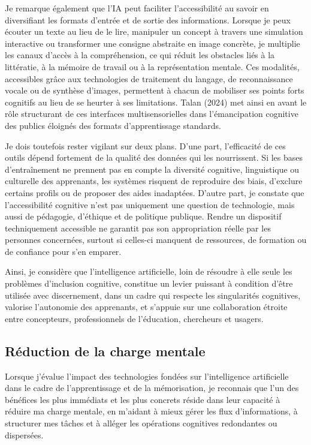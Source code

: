 \documentclass[11pt,a4paper]{report}
\begin{document}
Je remarque également que l’IA peut faciliter l’accessibilité au savoir en diversifiant les formats d’entrée et de sortie des informations. Lorsque je peux écouter un texte au lieu de le lire, manipuler un concept à travers une simulation interactive ou transformer une consigne abstraite en image concrète, je multiplie les canaux d’accès à la compréhension, ce qui réduit les obstacles liés à la littératie, à la mémoire de travail ou à la représentation mentale. Ces modalités, accessibles grâce aux technologies de traitement du langage, de reconnaissance vocale ou de synthèse d’images, permettent à chacun de mobiliser ses points forts cognitifs au lieu de se heurter à ses limitations. Talan (2024) met ainsi en avant le rôle structurant de ces interfaces multisensorielles dans l’émancipation cognitive des publics éloignés des formats d’apprentissage standards.

Je dois toutefois rester vigilant sur deux plans. D’une part, l’efficacité de ces outils dépend fortement de la qualité des données qui les nourrissent. Si les bases d’entraînement ne prennent pas en compte la diversité cognitive, linguistique ou culturelle des apprenants, les systèmes risquent de reproduire des biais, d’exclure certains profils ou de proposer des aides inadaptées. D’autre part, je constate que l’accessibilité cognitive n’est pas uniquement une question de technologie, mais aussi de pédagogie, d’éthique et de politique publique. Rendre un dispositif techniquement accessible ne garantit pas son appropriation réelle par les personnes concernées, surtout si celles-ci manquent de ressources, de formation ou de confiance pour s’en emparer.

Ainsi, je considère que l’intelligence artificielle, loin de résoudre à elle seule les problèmes d’inclusion cognitive, constitue un levier puissant à condition d’être utilisée avec discernement, dans un cadre qui respecte les singularités cognitives, valorise l’autonomie des apprenants, et s’appuie sur une collaboration étroite entre concepteurs, professionnels de l’éducation, chercheurs et usagers.

\subsection{Réduction de la charge mentale}

Lorsque j’évalue l’impact des technologies fondées sur l’intelligence artificielle dans le cadre de l’apprentissage et de la mémorisation, je reconnais que l’un des bénéfices les plus immédiats et les plus concrets réside dans leur capacité à réduire ma charge mentale, en m’aidant à mieux gérer les flux d’informations, à structurer mes tâches et à alléger les opérations cognitives redondantes ou dispersées.
\end{document}
